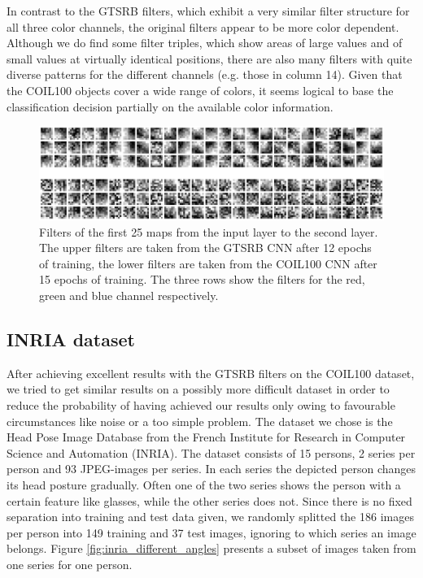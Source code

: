\documentclass[11pt, a4paper]{article}
\begin{document}
In contrast to the GTSRB filters, which exhibit a very similar filter structure for all three color channels, the original filters appear to be more color dependent. Although we do find some filter triples, which show areas of large values and of small values at virtually identical positions, there are also many filters with quite diverse patterns for the different channels (e.g. those in column 14). Given that the COIL100 objects cover a wide range of colors, it seems logical to base the classification decision partially on the available color information.

\begin{figure}[h!]
	\centering
	\includegraphics[width=1\textwidth]{gtsrb_vs_coil_filters.png}
	\caption{Filters of the first 25 maps from the input layer to the second layer. The upper filters are taken from the GTSRB CNN after 12 epochs of training, the lower filters are taken from the COIL100 CNN after 15 epochs of training. The three rows show the filters for the red, green and blue channel respectively.}
	\label{fig:gtsrb_vs_coil_filters}
\end{figure}


\subsection{INRIA dataset}
\label{subsec:inria}

After achieving excellent results with the GTSRB filters on the COIL100 dataset, we tried to get similar results on a possibly more difficult dataset in order to reduce the probability of having achieved our results only owing to favourable circumstances like noise or a too simple problem. The dataset we chose is the Head Pose Image Database \cite{estimating-face-orientation-inria} from the French Institute for Research in Computer Science and Automation (INRIA). The dataset consists of 15 persons, 2 series per person and 93 JPEG-images per series. In each series the depicted person changes its head posture gradually. Often one of the two series shows the person with a certain feature like glasses, while the other series does not. Since there is no fixed separation into training and test data given, we randomly splitted the 186 images per person into 149 training and 37 test images, ignoring to which series an image belongs. Figure \ref{fig:inria_different_angles} presents a subset of images taken from one series for one person.
\end{document}
